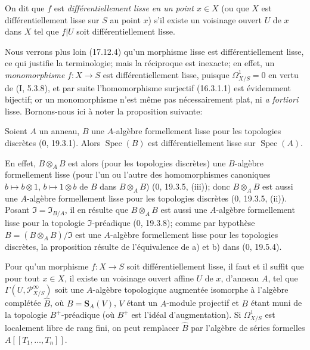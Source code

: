 On dit que $f$ est \emph{différentiellement lisse en un point $x\in X$} (ou
que $X$ est différentiellement lisse sur $S$ au point $x$) s'il existe un
voisinage ouvert $U$ de $x$ dans $X$ tel que $f|U$ soit différentiellement
lisse.

Nous verrons plus loin (17.12.4) qu'un morphisme lisse est différentiellement
lisse, ce qui justifie la terminologie; mais la réciproque est inexacte; en
effet, un \emph{monomorphisme} $f:X\to S$ est différentiellement lisse,
puisque $\Omega_{X/S}^1=0$ en vertu de (I, 5.3.8), et par suite
l'homomorphisme surjectif (16.3.1.1) est évidemment bijectif; or un
monomorphisme n'est même pas nécessairement plat, ni \emph{a fortiori} lisse.
Bornons-nous ici à noter la proposition suivante:

\begin{proposition}[16.10.2]
\label{IV.16.10.2}
Soient $A$ un anneau, $B$ une $A$-algèbre formellement lisse pour les
topologies discrètes (0, 19.3.1). Alors $\operatorname{Spec}(B)$ est
différentiellement lisse sur $\operatorname{Spec}(A)$.
\end{proposition}

En effet, $B\otimes_A B$ est alors (pour les topologies discrètes) une
$B$-algèbre formellement lisse (pour l'un ou l'autre des homomorphismes
canoniques $b\mapsto b\otimes1$, $b\mapsto1\otimes b$ de $B$
dans $B\otimes_A B$) (0, 19.3.5, (iii)); donc $B\otimes_A B$ est aussi une
$A$-algèbre formellement lisse pour les topologies discrètes (0, 19.3.5,
(ii)). Posant $\mathfrak{I}=\mathfrak{I}_{B/A}$, il en résulte que
$B\otimes_A B$ est aussi une $A$-algèbre formellement lisse pour la topologie
$\mathfrak{I}$-préadique (0, 19.3.8); comme par hypothèse
$B=(B\otimes_A B)/\mathfrak{I}$ est une $A$-algèbre formellement lisse pour
les topologies discrètes, la proposition résulte de l'équivalence de a) et b)
dans (0, 19.5.4).

\begin{proposition}[16.10.3]
\label{IV.16.10.3}
Pour qu'un morphisme $f:X\to S$ soit différentiellement lisse, il faut et il
suffit que pour tout $x\in X$, il existe un voisinage ouvert affine $U$ de
$x$, d'anneau $A$, tel que $\Gamma(U,\mathscr{P}_{X/S}^{\infty})$ soit une
$A$-algèbre topologique augmentée isomorphe à l'algèbre complétée $\widehat B$,
où $B=\mathbf{S}_A(V)$, $V$ étant un $A$-module projectif et $B$ étant muni de
la topologie $B^+$-préadique (où $B^+$ est l'idéal d'augmentation). Si
$\Omega_{X/S}^1$ est localement libre de rang fini, on peut remplacer
$\widehat B$ par l'algèbre de séries formelles $A[[T_1,\ldots,T_n]]$.
\end{proposition}

